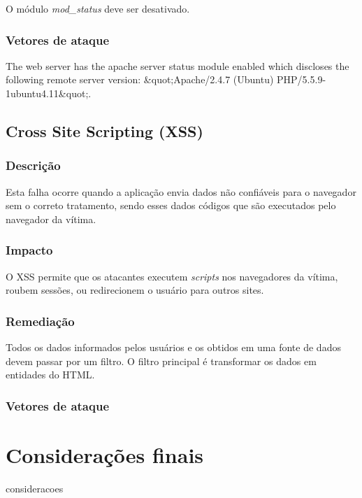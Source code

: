 \documentclass{ufscThesis}
\newcommand{\+}{\discretionary{\mbox{${\bm\cdot}\mkern-1mu$}}{}{}}
\renewcommand\+{\discretionary{}{}{}}
\begin{document}
O módulo \emph{mod_status} deve ser desativado.

\subsection{Vetores de ataque}


The web server has the apache server status module enabled which discloses the following remote server version: &quot;Apache/2.4.7 (Ubuntu) PHP/5.5.9-1ubuntu4.11&quot;.\section{Cross Site Scripting (XSS)}

\subsection{Descrição}

Esta falha ocorre quando a aplicação envia dados não confiáveis para o navegador sem o correto tratamento, sendo esses dados códigos que são executados pelo navegador da vítima.

\subsection{Impacto}
O XSS permite que os atacantes executem \emph{scripts} nos navegadores da vítima, roubem sessões, ou redirecionem o usuário para outros sites.

\subsection{Remediação}

Todos os dados informados pelos usuários e os obtidos em uma fonte de dados devem passar por um filtro. O filtro principal é transformar os dados em entidades do HTML.

\subsection{Vetores de ataque}



\chapter{Considerações finais}
consideracoes
\end{document}
